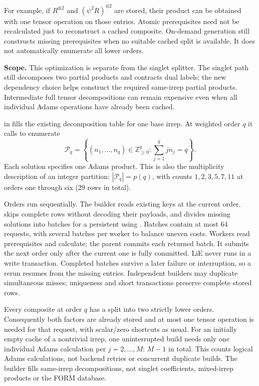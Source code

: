 For example, if $R^{\otimes2}$ and $(\psi^2R)^{\otimes2}$ are stored, their
product can be obtained with one tensor operation on those entries. Atomic
prerequisites need not be recalculated just to reconstruct a cached composite.
On-demand generation still constructs missing prerequisites when no suitable
cached split is available. It does not automatically enumerate all lower orders.

\textbf{Scope.} This optimization is separate from the singlet splitter. The
singlet path still decomposes two partial products and contracts dual labels;
the new dependency choice helps construct the required same-irrep partial
products. Intermediate full tensor decompositions can remain expensive even
when all individual Adams operations have already been cached.

\clearpage
{}
in  fills the existing decomposition
table for one base irrep. At weighted order $q$ it calls
 to enumerate
\[
 \mathcal P_q=\left\{(n_1,\ldots,n_q)\in\mathbb Z_{\geq0}^q:
                 \sum_{j=1}^{q}j n_j=q\right\}.
\]
Each solution specifies one Adams product. This is also the multiplicity
description of an integer partition: $|\mathcal P_q|=p(q)$, with counts
$1,2,3,5,7,11$ at orders one through six (29 rows in total).

Orders run sequentially. The builder reads existing keys at the current order,
skips complete rows without decoding their payloads, and divides missing
solutions into batches for a persistent  using
. Batches contain at most 64 requests, with several batches per
worker to balance uneven costs. Workers read prerequisites and calculate;
the parent commits each returned batch. It submits the next order only after
the current one is fully committed. LiE never runs in a write transaction.
Completed batches survive a later failure or interruption, so a rerun resumes
from the missing entries. Independent builders may duplicate simultaneous
misses; uniqueness and short transactions preserve complete stored rows.

Every composite at order $q$ has a split into two strictly lower orders.
Consequently both factors are already stored and at most one tensor operation
is needed for that request, with scalar/zero shortcuts as usual. For an initially
empty cache of a nontrivial irrep, one uninterrupted build needs only one
individual Adams calculation per $j=2,\ldots,M$: $M-1$ in total. This counts
logical Adams calculations, not backend retries or concurrent duplicate builds.
The builder fills same-irrep decompositions, not singlet coefficients, mixed-irrep
products or the FORM database.

